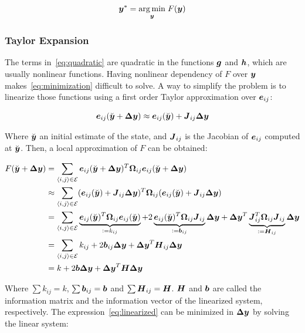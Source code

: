 \begin{equation}
\boldsymbol{y}^* = \underset{\boldsymbol{y}}{\arg\min} \;F(\boldsymbol{y})
\label{eq:minimization}
\end{equation}

\subsubsection{Taylor Expansion}

The terms in~\eqref{eq:quadratic} are quadratic in the functions $\boldsymbol{g}$ and $\boldsymbol{h}$, which are usually nonlinear functions. Having nonlinear dependency of $F$ over $\boldsymbol{y}$ makes~\eqref{eq:minimization} difficult to solve. A way to simplify the problem is to linearize those functions using a first order Taylor approximation over $\boldsymbol{e}_{ij}$:

\begin{equation}
\boldsymbol{e}_{ij}(\breve{\boldsymbol{y}}+\boldsymbol{\Delta y}) \approx \boldsymbol{e}_{ij}(\breve{\boldsymbol{y}}) + \boldsymbol{J}_{ij}\boldsymbol{\Delta y}
\end{equation}

Where $\breve{\boldsymbol{y}}$ an initial estimate of the state, and $\boldsymbol{J}_{ij}$ is the Jacobian of $\boldsymbol{e}_{ij}$ computed at $\breve{\boldsymbol{y}}$. Then, a local approximation of $F$ can be obtained:

\begin{align}
F(\breve{\boldsymbol{y}}+\boldsymbol{\Delta y}) &= \sum_{\left<i,j\right>\in\mathcal{E}}
\boldsymbol{e}_{ij}(\breve{\boldsymbol{y}}+\boldsymbol{\Delta y})^T\boldsymbol{\Omega}_{ij} 
\boldsymbol{e}_{ij}(\breve{\boldsymbol{y}}+\boldsymbol{\Delta y}) \notag \\
& \approx \sum_{\left<i,j\right>\in\mathcal{E}} 
(\boldsymbol{e}_{ij}(\breve{\boldsymbol{y}}) + \boldsymbol{J}_{ij}\boldsymbol{\Delta y})^T \boldsymbol{\Omega}_{ij}
(\boldsymbol{e}_{ij}(\breve{\boldsymbol{y}}) + \boldsymbol{J}_{ij}\boldsymbol{\Delta y})\notag \\
&= \sum_{\left<i,j\right>\in\mathcal{E}}
\underbrace{\boldsymbol{e}_{ij}(\breve{\boldsymbol{y}})^T\boldsymbol{\Omega}_{ij}\boldsymbol{e}_{ij}(\breve{\boldsymbol{y}})}_{\vcentcolon= k_{ij}}
+2\underbrace{\boldsymbol{e}_{ij}(\breve{\boldsymbol{y}})^T\boldsymbol{\Omega}_{ij}\boldsymbol{J}_{ij}}_{ \vcentcolon= \boldsymbol{b}_{ij}}\boldsymbol{\Delta y}
+\boldsymbol{\Delta y}^T
\underbrace{\boldsymbol{J}_{ij}^T\boldsymbol{\Omega}_{ij}\boldsymbol{J}_{ij}}_{\vcentcolon= \boldsymbol{H}_{ij}}
\boldsymbol{\Delta y} \notag \\
&= \sum_{\left<i,j\right>\in\mathcal{E}} k_{ij} + 2\boldsymbol{b}_{ij}\boldsymbol{\Delta y} + \boldsymbol{\Delta y}^T \boldsymbol{H}_{ij} \boldsymbol{\Delta y} \notag \\
&= k + 2\boldsymbol{b} \boldsymbol{\Delta y} + \boldsymbol{\Delta y}^T \boldsymbol{H} \boldsymbol{\Delta y}
\label{eq:linearized}
\end{align}

Where $\sum k_{ij} = k$, $\sum \boldsymbol{b}_{ij} = \boldsymbol{b}$ and $\sum \boldsymbol{H}_{ij} = \boldsymbol{H}$. $\boldsymbol{H}$ and $\boldsymbol{b}$ are called the information matrix and the information vector of the linearized system, respectively. The expression~\eqref{eq:linearized} can be minimized in $\boldsymbol{\Delta y}$ by solving the linear system:

